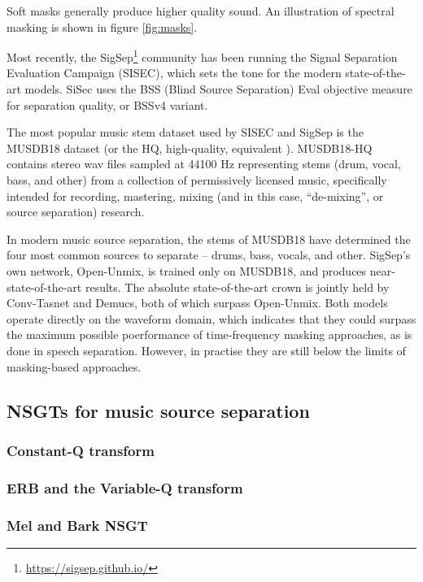 \documentclass[letter,12pt,notitlepage]{article}
\begin{document}
Soft masks generally produce higher quality sound. An illustration of spectral masking is shown in figure \ref{fig:masks}.

Most recently, the SigSep\footnote{\url{https://sigsep.github.io/}} community has been running the Signal Separation Evaluation Campaign (SISEC), which sets the tone for the modern state-of-the-art models. SiSec uses the BSS (Blind Source Separation) Eval \cite{bss} objective measure for separation quality, or BSSv4 variant.

The most popular music stem dataset used by SISEC and SigSep is the MUSDB18 dataset \cite{musdb18} (or the HQ, high-quality, equivalent \cite{musdb18-hq}). MUSDB18-HQ contains stereo wav files sampled at 44100 Hz representing stems (drum, vocal, bass, and other) from a collection of permissively licensed music, specifically intended for recording, mastering, mixing (and in this case, ``de-mixing'', or source separation) research.

In modern music source separation, the stems of MUSDB18 have determined the four most common sources to separate -- drums, bass, vocals, and other. SigSep's own network, Open-Unmix, is trained only on MUSDB18, and produces near-state-of-the-art results. The absolute state-of-the-art crown is jointly held by Conv-Tasnet and Demucs, both of which surpass Open-Unmix. Both models operate directly on the waveform domain, which indicates that they could surpass the maximum possible poerformance of time-frequency masking approaches, as is done in speech separation. However, in practise they are still below the limits of masking-based approaches.

\subsection{NSGTs for music source separation}

\subsubsection{Constant-Q transform}

\subsubsection{ERB and the Variable-Q transform}

\subsubsection{Mel and Bark NSGT}
\end{document}
